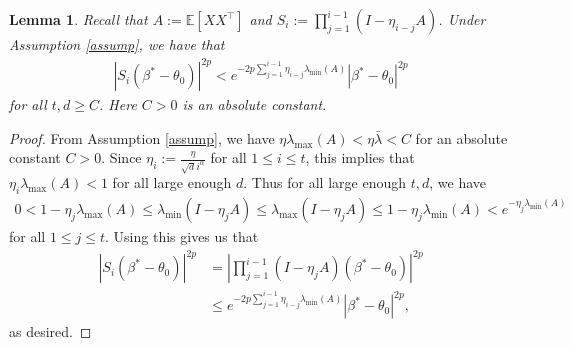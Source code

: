 \documentclass[11pt, reqno,english]{amsart}
\newtheorem{lemma}{Lemma}[section]
\begin{document}
\begin{lemma}\label{S_imoment}
Recall that $A := \mathbb{E}[XX^\top]$ and $S_i := \prod_{j = 1}^{i-1}(I - \eta_{i-j}A)$. Under Assumption \ref{assump}, we have that
\begin{align*}
|S_i (\beta^* - \theta_0)|^{2p} < e^{-2p\sum_{j = 1}^{i-1}\eta_{i-j}\lambda_{\min}(A)}|\beta^* - \theta_0|^{2p}
\end{align*}
for all $t,d \geq C$. Here $C > 0$ is an absolute constant. 
\end{lemma}
\begin{proof}
From Assumption \ref{assump}, we have $\eta \lambda_{\max}(A) < \eta \bar{\lambda} < C$ for an absolute constant $C > 0$. Since $\eta_i := \frac{\eta}{\sqrt{d}i^{\alpha}}$ for all $1\leq i \leq t$, this implies that $\eta_i \lambda_{\max}(A) < 1$ for all large enough $d$. Thus for all large enough $t,d$, we have  
\begin{align*}
0 < 1 -  \eta_j \lambda_{\max}(A) \leq \lambda_{\min}(I - \eta_jA)\leq \lambda_{\max}(I - \eta_jA) \leq 1 - \eta_j\lambda_{\min}(A) < e^{-\eta_j \lambda_{\min}(A)}
\end{align*}
for all $1 \leq j \leq t$. Using this gives us that
\begin{align*}
|S_i (\beta^* - \theta_0)|^{2p} &= |\prod_{j = 1}^{i-1}(I - \eta_jA)(\beta^* - \theta_0)|^{2p}
\\
&\leq e^{-2p\sum_{j=1}^{i-1}\eta_{i-j}\lambda_{\min}(A)}|\beta^* - \theta_0|^{2p},
\end{align*}
as desired.
\end{proof}
\end{document}
